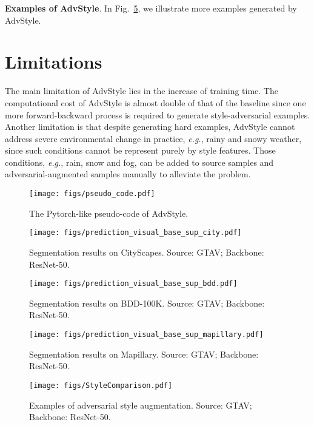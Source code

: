 \documentclass{article}
\def\eg{\emph{e.g.}} \def\Eg{\emph{E.g.}}
\newcommand{\ours}{AdvStyle\xspace}
\begin{document}
\textbf{Examples of \ours}. In Fig.~\ref{fig:style_comparsison}, we illustrate more examples generated by \ours.

\section{Limitations}
\label{sec:limitations}
The main limitation of \ours lies in the increase of training time. The computational cost of \ours is almost double of that of the baseline since one more forward-backward process is required to generate style-adversarial examples.
Another limitation is that despite generating hard examples, \ours cannot address severe environmental change in practice, \eg, rainy and snowy weather, since such conditions cannot be represent purely by style features. Those conditions, \eg, rain, snow and fog, can be added to source samples and adversarial-augmented samples manually to alleviate the problem.

\begin{figure}[!ht]
\centering
\texttt{[image: figs/pseudo\_code.pdf]}
\caption{The Pytorch-like pseudo-code of \ours.}
\label{fig:pseudo_code}
\end{figure}


\begin{figure}[!ht]
\centering
\texttt{[image: figs/prediction\_visual\_base\_sup\_city.pdf]}
\vspace{-.1in}
\caption{Segmentation results on CityScapes. Source: GTAV; Backbone: ResNet-50.}
\label{fig:seg_city}
\end{figure}


\begin{figure}[!ht]
\centering
\texttt{[image: figs/prediction\_visual\_base\_sup\_bdd.pdf]}
\vspace{-.1in}
\caption{Segmentation results on BDD-100K. Source: GTAV; Backbone: ResNet-50.}
\label{fig:seg_bdd}
\end{figure}


\begin{figure}[!ht]
\centering
\texttt{[image: figs/prediction\_visual\_base\_sup\_mapillary.pdf]}
\vspace{-.1in}
\caption{Segmentation results on Mapillary. Source: GTAV; Backbone: ResNet-50.}
\label{fig:seg_maphillary}
\end{figure}



\begin{figure}[!ht]
\centering
\texttt{[image: figs/StyleComparison.pdf]}
\vspace{-.1in}
\caption{Examples of adversarial style augmentation. Source: GTAV; Backbone: ResNet-50.}
\label{fig:style_comparsison}
\end{figure}
\end{document}
